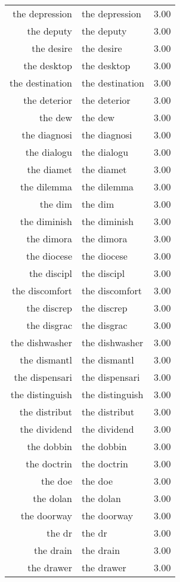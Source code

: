 \begin{table}[ht]
\begin{tabular}{rlr}
  the depression & the depression & 3.00 \\ 
  the deputy & the deputy & 3.00 \\ 
  the desire & the desire & 3.00 \\ 
  the desktop & the desktop & 3.00 \\ 
  the destination & the destination & 3.00 \\ 
  the deterior & the deterior & 3.00 \\ 
  the dew & the dew & 3.00 \\ 
  the diagnosi & the diagnosi & 3.00 \\ 
  the dialogu & the dialogu & 3.00 \\ 
  the diamet & the diamet & 3.00 \\ 
  the dilemma & the dilemma & 3.00 \\ 
  the dim & the dim & 3.00 \\ 
  the diminish & the diminish & 3.00 \\ 
  the dimora & the dimora & 3.00 \\ 
  the diocese & the diocese & 3.00 \\ 
  the discipl & the discipl & 3.00 \\ 
  the discomfort & the discomfort & 3.00 \\ 
  the discrep & the discrep & 3.00 \\ 
  the disgrac & the disgrac & 3.00 \\ 
  the dishwasher & the dishwasher & 3.00 \\ 
  the dismantl & the dismantl & 3.00 \\ 
  the dispensari & the dispensari & 3.00 \\ 
  the distinguish & the distinguish & 3.00 \\ 
  the distribut & the distribut & 3.00 \\ 
  the dividend & the dividend & 3.00 \\ 
  the dobbin & the dobbin & 3.00 \\ 
  the doctrin & the doctrin & 3.00 \\ 
  the doe & the doe & 3.00 \\ 
  the dolan & the dolan & 3.00 \\ 
  the doorway & the doorway & 3.00 \\ 
  the dr & the dr & 3.00 \\ 
  the drain & the drain & 3.00 \\ 
  the drawer & the drawer & 3.00 \\ 

\end{tabular}
\end{table}
